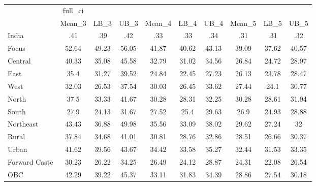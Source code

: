 \begin{tabular}{l*{9}{c}}
\toprule
                    &     full\_ci&            &            &            &            &            &            &            &            \\
                    &      Mean\_3&        LB\_3&        UB\_3&      Mean\_4&        LB\_4&        UB\_4&      Mean\_5&        LB\_5&        UB\_5\\
\midrule
India               &         .41&         .39&         .42&         .33&         .33&         .34&         .31&         .31&         .32\\
Focus               &       52.64&       49.23&       56.05&       41.87&       40.62&       43.13&       39.09&       37.62&       40.57\\
Central             &       40.33&       35.08&       45.58&       32.79&       31.02&       34.56&       26.84&       24.72&       28.97\\
East                &        35.4&       31.27&       39.52&       24.84&       22.45&       27.23&       26.13&       23.78&       28.47\\
West                &       32.03&       26.53&       37.54&       30.03&       26.45&       33.62&       27.44&        24.1&       30.77\\
North               &        37.5&       33.33&       41.67&       30.28&       28.31&       32.25&       30.28&       28.61&       31.94\\
South               &        27.9&       24.13&       31.67&       27.52&        25.4&       29.63&        26.9&       24.93&       28.88\\
Northeast           &       43.43&       36.88&       49.98&       35.56&       33.09&       38.02&       29.62&       27.24&          32\\
Rural               &       37.84&       34.68&       41.01&       30.81&       28.76&       32.86&       28.51&       26.66&       30.37\\
Urban               &       41.62&       39.56&       43.67&       34.42&       33.58&       35.27&       32.44&       31.53&       33.35\\
Forward Caste       &       30.23&       26.22&       34.25&       26.49&       24.12&       28.87&       24.31&       22.08&       26.54\\
OBC                 &       42.29&       39.22&       45.37&       33.11&       31.83&       34.39&       28.86&       27.54&       30.18\\

\end{tabular}
